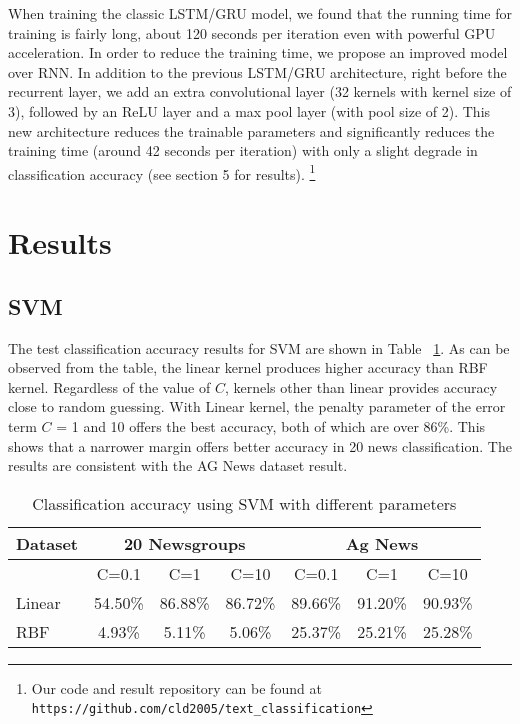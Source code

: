 \documentclass{article}
\begin{document}
When training the classic LSTM/GRU model, we found that the running time for training is fairly long, about 120 seconds per iteration even with powerful GPU acceleration. In order to reduce the training time, we propose an improved model over RNN. In addition to the previous LSTM/GRU architecture, right before the recurrent layer, we add an extra convolutional layer (32 kernels with kernel size of 3), followed by an ReLU layer and a max pool layer (with pool size of 2). This new architecture reduces the trainable parameters and significantly reduces the training time (around 42 seconds per iteration) with only a slight degrade in classification accuracy (see section 5 for results). \footnote{Our code and result repository can be found at \texttt{https://github.com/cld2005/text\_classification}}



\section{Results}

\subsection{SVM}
The test classification accuracy results for SVM are shown in Table ~\ref{Tab1}. As can be observed from the table, the linear kernel produces higher accuracy than RBF kernel. Regardless of the value of $C$, kernels other than linear provides accuracy close to random guessing. With Linear kernel, the penalty parameter of the error term $C$ = 1 and 10 offers the best accuracy, both of which are over 86\%. This shows that a narrower margin offers better accuracy in 20 news classification. The results are consistent with the AG News dataset result.

\begin{table}[h!]
  \begin{center}
    \begin{tabular}{| l | c | c | c | c | c | c |}
      \hline
      Dataset & \multicolumn{3}{c|}{20 Newsgroups} & \multicolumn{3}{c|}{Ag News} \\ \hline
      & C=0.1 & C=1 & C=10 & C=0.1 & C=1 & C=10 \\ \hline
      Linear & 54.50\% & 86.88\% & 86.72\% & 89.66\% & 91.20\% & 90.93\% \\ \hline
      RBF & 4.93\% & 5.11\% & 5.06\% & 25.37\% & 25.21\% & 25.28\% \\ \hline
    \end{tabular}
    \caption{\small Classification accuracy using SVM with different parameters}
    \label{Tab1}
  \end{center}
\end{table}
\end{document}
